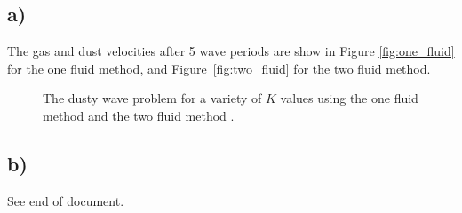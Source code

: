 \documentclass{article}
\begin{document}
\subsection*{a)}
The gas and dust velocities after 5 wave periods are show in Figure
\ref{fig:one_fluid} for the one fluid method, and Figure~\ref{fig:two_fluid} for
the two fluid method.
\begin{figure}%
    \centering
    \qquad
    \caption[]{The dusty wave problem for a variety of $K$ values using
    the one fluid method  and the
    two fluid method .}
    \end{figure}
    
\subsection*{b)}
See end of document.
\end{document}
